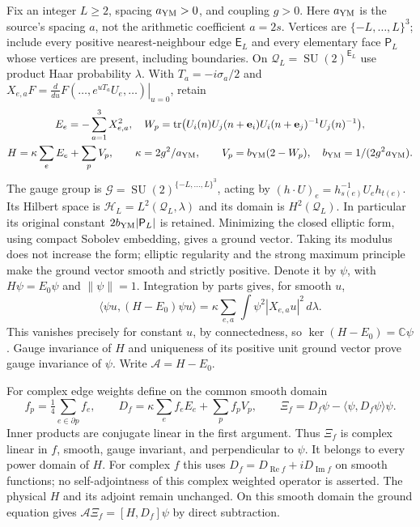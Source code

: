 Fix an integer $L\ge2$, spacing $a_{\rm YM}>0$, and coupling $g>0$.
Here $a_{\rm YM}$ is the source's spacing $a$, not the arithmetic
coefficient $a=2s$. Vertices are $\{-L,\ldots,L\}^3$; include every
positive nearest-neighbour edge $\mathsf E_L$ and every elementary
face $\mathsf P_L$ whose vertices are present, including boundaries.
On $\mathcal Q_L=\operatorname{SU}(2)^{\mathsf E_L}$ use product
Haar probability $\lambda$. With $T_a=-i\sigma_a/2$ and
$X_{e,a}F=\left.\frac{d}{du}F(\ldots,e^{uT_a}U_e,\ldots)\right|_{u=0}$,
retain
\begin{gather*}
 E_e=-\sum_{a=1}^3X_{e,a}^2,\quad
 W_p=\operatorname{tr}\bigl(U_i(n)U_j(n+\mathbf e_i)
 U_i(n+\mathbf e_j)^{-1}U_j(n)^{-1}\bigr),\\
 H=\kappa\sum_eE_e+\sum_pV_p,\qquad
 \kappa=2g^2/a_{\rm YM},\qquad
 V_p=b_{\rm YM}(2-W_p),\quad b_{\rm YM}=1/(2g^2a_{\rm YM}).
\end{gather*}
The gauge group is
$\mathcal G=\operatorname{SU}(2)^{\{-L,\ldots,L\}^3}$, acting by
$(h\cdot U)_e=h_{s(e)}^{-1}U_eh_{t(e)}$.
Its Hilbert space is $\mathscr H_L=L^2(\mathcal Q_L,\lambda)$
and its domain is $H^2(\mathcal Q_L)$. In particular its original
constant $2b_{\rm YM}|\mathsf P_L|$ is retained. Minimizing the
closed elliptic form, using compact Sobolev embedding, gives a
ground vector. Taking its modulus does not increase the form;
elliptic regularity and the strong maximum principle make the
ground vector smooth and strictly positive. Denote it by $\psi$,
with $H\psi=E_0\psi$ and $\|\psi\|=1$.
Integration by parts gives, for smooth $u$,
\[
 \langle\psi u,(H-E_0)\psi u\rangle
 =\kappa\sum_{e,a}\int\psi^2|X_{e,a}u|^2\,d\lambda .
\]
This vanishes precisely for constant $u$, by connectedness, so
$\ker(H-E_0)=\mathbb C\psi$. Gauge invariance of $H$ and uniqueness
of its positive unit ground vector prove gauge invariance of $\psi$.
Write $\mathcal A=H-E_0$.

For complex edge weights define on the common smooth domain
\[
 f_p=\tfrac14\sum_{e\in\partial p}f_e,\qquad
 D_f=\kappa\sum_ef_eE_e+\sum_pf_pV_p,\qquad
 \Xi_f=D_f\psi-\langle\psi,D_f\psi\rangle\psi .
\]
Inner products are conjugate linear in the first argument.
Thus $\Xi_f$ is complex linear in $f$, smooth, gauge invariant,
and perpendicular to $\psi$. It belongs to every power domain of
$H$. For complex $f$ this uses
$D_f=D_{\operatorname{Re}f}+iD_{\operatorname{Im}f}$ on smooth
functions; no self-adjointness of this complex weighted operator
is asserted. The physical $H$ and its adjoint remain unchanged.
On this smooth domain the ground equation gives
$\mathcal A\Xi_f=[H,D_f]\psi$ by direct subtraction.

